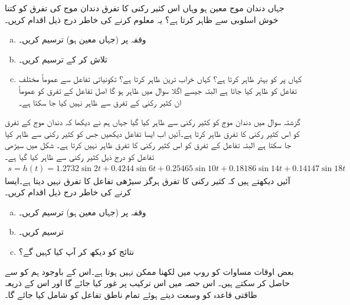 جہاں دندان موج معین ہو وہاں اس کثیر رکنی کا تفرق دندان موج کی تفرق کو کتنا خوش اسلوبی سے ظاہر کرتا ہے؟ یہ معلوم کرنے کی خاطر درج ذیل اقدام کریں۔
\begin{enumerate}[a.]

\item
وقفہ  پر  (جہاں معین ہو) ترسیم کریں۔
\item
{} تلاش کر کے ترسیم کریں۔
\item
کہاں پر  کو  بہتر ظاہر کرتا ہے؟ کہاں خراب ترین ظاہر کرتا ہے؟ تکونیاتی تفاعل سے عموماً مختلف تفاعل کو ظاہر کیا جاتا ہے البتہ جیسے اگلا سوال میں ظاہر ہو گا اصل تفاعل کے تفرق کو عموماً ان کثیر رکنی کے تفرق سے ظاہر نہیں کیا جا سکتا ہے۔
\end{enumerate}
  گزشتہ سوال میں دندان موج کو کثیر رکنی سے ظاہر کیا گیا جہاں ہم نے دیکھا کہ دندان موج کے تفرق کو اس کثیر رکنی کا تفرق ظاہر کرتا ہے۔آئیں اب ایسا تفاعل دیکھیں جس کو کثیر رکنی سے ظاہر کیا جا سکتا ہے البتہ تفاعل کے تفرق کو اس کثیر رکنی کا تفرق ظاہر نہیں کرتا ہے۔ شکل  میں سیڑھی تفاعل کو درج ذیل کثیر رکنی سے ظاہر کیا گیا ہے۔
\begin{align*}
s=h(t)=1.2732\sin 2t+0.4244\sin 6t+0.25465\sin 10t+0.18186\sin 14t+0.14147\sin 18t
\end{align*} 
آئیں دیکھتے ہیں کہ کثیر رکنی کا تفرق ہرگز سیڑھی تفاعل کا تفرق نہیں دیتا ہے۔ایسا کرنے کی خاطر درج ذیل اقدام کریں۔
\begin{enumerate}[a.]

\item
وقفہ  پر  (جہاں معین ہو) ترسیم کریں۔
\item
{} ترسیم کریں۔
\item
نتائج کو دیکھ کر آپ کیا کہیں گے؟
\end{enumerate}

بعض اوقات مساوات  کو  روپ میں لکھنا ممکن نہیں ہوتا ہے۔اس کے باوجود ہم  کو  سے حاصل کر سکتے ہیں۔ اس حصہ میں اس ترکیب پر غور کیا جائے گا اور  اس کے ذریعہ طاقتی قاعدہ کو وسعت دیتے ہوئے تمام ناطق تفاعل کو شامل کیا جائے گا۔

